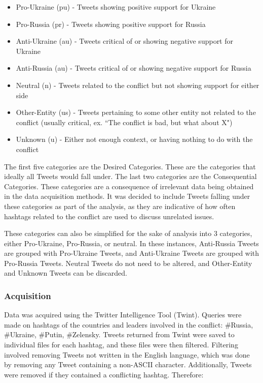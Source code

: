 \documentclass[12pt,letterpaper,oneside,titlepage]{article}
\begin{document}
\begin{itemize}
    \item Pro-Ukraine (pu) - Tweets showing positive support for Ukraine
    \item Pro-Russia (pr) - Tweets showing positive support for Russia
    \item Anti-Ukraine (au) - Tweets critical of or showing negative support for Ukraine
    \item Anti-Russia (au) - Tweets critical of or showing negative support for Russia
    \item Neutral (n) - Tweets related to the conflict but not showing support for either side
    \item Other-Entity (us) - Tweets pertaining to some other entity not related to the conflict (usually critical, ex. ``The conflict is bad, but what about X")
    \item Unknown (u) - Either not enough context, or having nothing to do with the conflict
\end{itemize}

The first five categories are the Desired Categories.
These are the categories that ideally all Tweets would fall under.
The last two categories are the Consequential Categories.
These categories are a consequence of irrelevant data being obtained in the data acquisition methods.
It was decided to include Tweets falling under these categories as part of the analysis, as they are indicative of how often
hashtags related to the conflict are used to discuss unrelated issues.

These categories can also be simplified for the sake of analysis into 3 categories, either Pro-Ukraine, Pro-Russia, or neutral.
In these instances, Anti-Russia Tweets are grouped with Pro-Ukraine Tweets, and Anti-Ukraine Tweets are grouped
with Pro-Russia Tweets.
Neutral Tweets do not need to be altered, and Other-Entity and Unknown Tweets can be discarded.

\subsubsection{Acquisition}\label{subsubsec:data-acquisition}

Data was acquired using the Twitter Intelligence Tool (Twint)\cite{twintproject}. 
Queries were made on hashtags of the countries and leaders involved in the conflict:  \#Russia, \#Ukraine, \#Putin, \#Zelensky.
Tweets returned from Twint were saved to individual files for each hashtag, and these files were then filtered.
Filtering involved removing Tweets not written in the English language, which was done by removing any Tweet containing a non-ASCII character.
Additionally, Tweets were removed if they contained a conflicting hashtag. Therefore:
\end{document}
